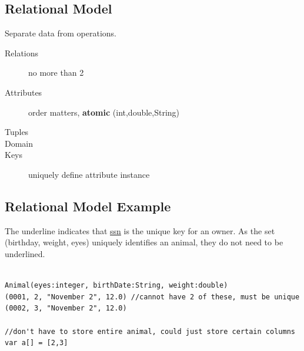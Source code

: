 \documentclass{article}
\begin{document}
\subsection{Relational Model}
Separate data from operations.

\begin{description}
    \item[Relations] {no more than 2}
    \item[Attributes] { order matters, \textbf{atomic} (int,double,String) }
    \item[Tuples]
    \item[Domain]
    \item[Keys] uniquely define attribute instance
\end{description}

\subsection{Relational Model Example}

\begin{figure}[h!]
\end{figure}
The underline indicates that \underline{ssn} is the unique key for an owner. As
the set (birthday, weight, eyes) uniquely identifies an animal, they do not need
to be underlined.

\begin{lstlisting}

Animal(eyes:integer, birthDate:String, weight:double)
(0001, 2, "November 2", 12.0) //cannot have 2 of these, must be unique
(0002, 3, "November 2", 12.0)

//don't have to store entire animal, could just store certain columns
var a[] = [2,3]
\end{lstlisting}
\end{document}
